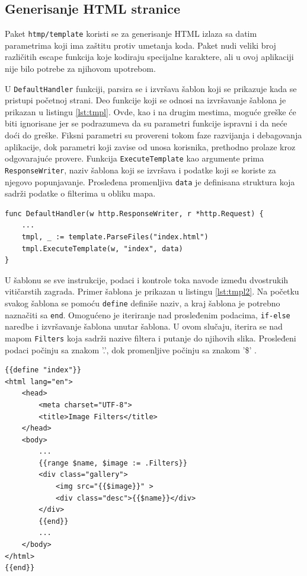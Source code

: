 \documentclass[12pt,oneside]{memoir}
\begin{document}
\subsection{Generisanje HTML stranice}

Paket \texttt{htmp/template} koristi se za generisanje HTML izlaza sa datim parametrima koji ima zaštitu protiv umetanja koda. Paket nudi veliki broj različitih escape funkcija koje kodiraju specijalne karaktere, ali u ovoj aplikaciji nije bilo potrebe za njihovom upotrebom. 

U \texttt{DefaultHandler} funkciji, parsira se i izvršava šablon koji se prikazuje kada se pristupi početnoj strani. Deo funkcije koji se odnosi na izvršavanje šablona je prikazan u listingu \ref{lst:tmpl}. Ovde, kao i na drugim mestima, moguće greške će biti ignorisane jer se podrazumeva da su parametri funkcije ispravni i da neće doći do greške. Fiksni parametri su provereni tokom faze razvijanja i debagovanja aplikacije, dok parametri koji zavise od unosa korisnika, prethodno prolaze kroz odgovarajuće provere. Funkcija \texttt{ExecuteTemplate} kao argumente prima \texttt{ResponseWriter}, naziv šablona koji se izvršava i podatke koji se koriste za njegovo popunjavanje. Prosleđena promenljiva \texttt{data} je definisana struktura koja sadrži podatke o filterima u obliku mapa.

\begin{center}
\begin{lstlisting}[caption=Izvršavanje HTML šablona,label={lst:tmpl},  backgroundcolor=\color{background}]
func DefaultHandler(w http.ResponseWriter, r *http.Request) {
	...
	tmpl, _ := template.ParseFiles("index.html")
	tmpl.ExecuteTemplate(w, "index", data)
}
\end{lstlisting}
\end{center}

U šablonu se sve instrukcije, podaci i kontrole toka navode između dvostrukih vitičarstih zagrada. Primer šablona je prikazan u listingu \ref{lst:tmpl2}. Na početku svakog šablona se pomoću \texttt{define} definiše naziv, a kraj šablona je potrebno naznačiti sa \texttt{end}. Omogućeno je iteriranje nad prosleđenim podacima, \texttt{if-else} naredbe i izvršavanje šablona unutar šablona. U ovom slučaju, iterira se nad mapom \texttt{Filters} koja sadrži nazive filtera i putanje do njihovih slika. Prosleđeni podaci počinju sa znakom '.', dok promenljive počinju sa znakom '\$' \cite{template}.

\begin{center}
\begin{lstlisting}[caption=Izvršavanje HTML šablona,label={lst:tmpl2},  backgroundcolor=\color{background}]
{{define "index"}}
<html lang="en">
	<head>
		<meta charset="UTF-8">
		<title>Image Filters</title>
	</head>
	<body>
		...
		{{range $name, $image := .Filters}}
		<div class="gallery">
			<img src="{{$image}}" >
			<div class="desc">{{$name}}</div>
		</div>
		{{end}}
		...
	</body>
</html>
{{end}}
\end{lstlisting}
\end{center}
\end{document}
